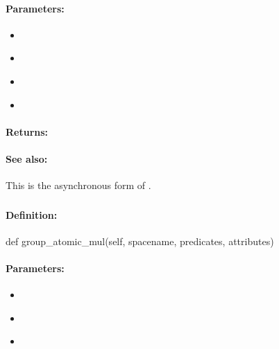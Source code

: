 \paragraph{Parameters:}
\begin{itemize}[noitemsep]
\item {}\\

\item {}\\

\item {}\\

\item {}\\

\end{itemize}

\paragraph{Returns:}


\paragraph{See also:}  This is the asynchronous form of .

\pagebreak
\subsubsection{}
\label{api:python:group_atomic_mul}


\paragraph{Definition:}
\begin{pythoncode}
def group_atomic_mul(self, spacename, predicates, attributes)
\end{pythoncode}

\paragraph{Parameters:}
\begin{itemize}[noitemsep]
\item {}\\

\item {}\\

\item {}\\

\end{itemize}

